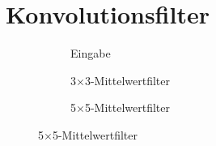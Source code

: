 \section{Konvolutionsfilter}
\begin{figure}
	\centering
	\begin{subfigure}{.32\textwidth}
		\centering
		\caption{Eingabe}
	\end{subfigure}
	\begin{subfigure}{.32\textwidth}
		\centering
		\caption{3$\times$3-Mittelwertfilter}
	\end{subfigure}
	\begin{subfigure}{.32\textwidth}
		\centering
		\caption{5$\times$5-Mittelwertfilter}
	\end{subfigure}
\end{figure}
